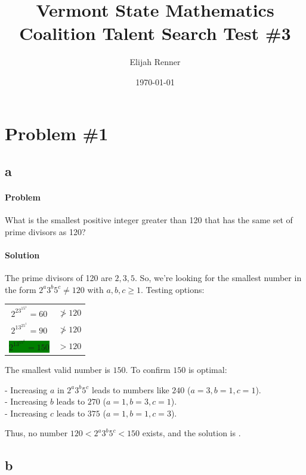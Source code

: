\documentclass[10pt]{article}
\title{Vermont State Mathematics Coalition Talent Search Test \#3}
\author{Elijah Renner}
\date{\today}
\theoremstyle{plain}
\theoremstyle{definition}
\theoremstyle{remark}
\begin{document}
\maketitle
\tableofcontents

\section{Problem \#1}

\subsection{a} 

\paragraph{Problem} What is the smallest positive integer greater than 120 that has the same set of prime divisors as 120?

\paragraph{Solution} The prime divisors of 120 are \(2,3,5\). So, we're looking for the smallest number in the form \(2^a3^b5^c\neq120\) with \(a,b,c\geqslant1\). Testing options:

\begin{center}
\begin{tabular}{c|c}
\colorbox{subtleRed}{\(\displaystyle 2^23^15^1 = 60\)} & \(\ngtr 120\) \\
\colorbox{subtleRed}{\(\displaystyle 2^13^25^1 = 90\)}  & \(\ngtr 120\) \\  
\colorbox{green}{\(\displaystyle 2^13^15^2 = 150\)} & \(>120\)  
\end{tabular}
\end{center}

The smallest valid number is \(150\). To confirm \(150\) is optimal:

- Increasing \(a\) in \(2^a3^b5^c\) leads to numbers like \(240\) (\(a = 3, b = 1, c = 1\)).\\
- Increasing \(b\) leads to \(270\) (\(a = 1, b = 3, c = 1\)).\\
- Increasing \(c\) leads to \(375\) (\(a = 1, b = 1, c = 3\)).

Thus, no number \(120 < 2^a3^b5^c < 150\) exists, and the solution is .

\subsection{b}
\end{document}

